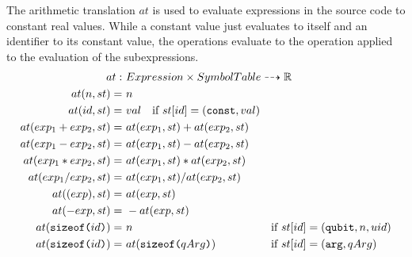 The arithmetic translation $at$ is used to evaluate expressions in the source code to constant real values. While a constant value just evaluates to itself and an identifier to its constant value, the operations evaluate to the operation applied to the evaluation of the subexpressions.
\begin{align*}
    at : \ & \rlap{$Expression \times SymbolTable \dashrightarrow \mathbb{R}$} &&\\
    at(n, st) = \ & n && \\
    at(id, st) = \ & val \quad \text{if } st[id] = (\texttt{const}, val)&& \\
    at(exp_1 + exp_2, st) = \ & at(exp_1, st) + at(exp_2, st)&& \\
    at(exp_1 - exp_2, st) = \ & at(exp_1, st) - at(exp_2, st)&& \\
    at(exp_1 * exp_2, st) = \ & at(exp_1, st) * at(exp_2, st)&& \\
    at(exp_1 / exp_2, st) = \ & at(exp_1, st) / at(exp_2, st)&& \\
    at((exp), st) = \ & at(exp, st)&& \\
    at(-exp, st) = \ & -at(exp, st)&& \\
    at(\texttt{sizeof(} id \texttt{)}) = \ & n && \text{if } st[id] = (\texttt{qubit}, n, uid)\\
    at(\texttt{sizeof(} id \texttt{)}) = \ & at(\texttt{sizeof(} qArg \texttt{)}) && \text{if } st[id] = (\texttt{arg}, qArg)
\end{align*}


